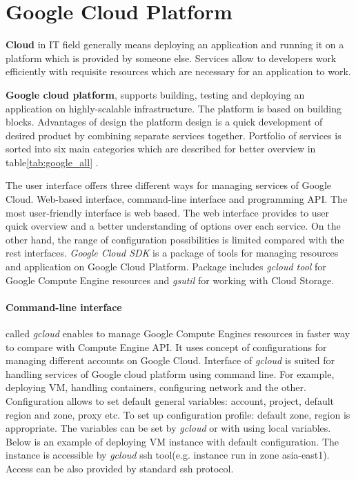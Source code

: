 \documentclass[a4paper,12pt,oneside]{report}
\begin{document}
		
	\section{Google Cloud Platform}
\textbf{Cloud} in IT field generally means deploying an application and running it on a platform which is 
provided by someone else. Services allow to developers  work efficiently  with 
requisite resources which are necessary for an application to work.

\textbf{Google cloud platform}, supports building, testing and deploying an application on highly-scalable 
infrastructure.
The platform is based on building blocks. Advantages of design the platform design is a quick development of 
desired product by combining separate services together. Portfolio of services is sorted into six main categories 
which are described for better overview in 
table\ref{tab:google_all} \cite{gc_product_services}.

The user interface offers three different ways for managing services of Google Cloud. Web-based interface, command-line 
interface and programming API. The most user-friendly interface is web based. The web interface provides to 
user quick overview and a better understanding of 
options over each service. On the other hand, the range of configuration possibilities is limited compared with the rest 
interfaces. \textit{Google Cloud SDK} is a 
package of tools for managing resources and application on Google Cloud Platform. 
Package includes \textit{gcloud tool} for Google Compute Engine resources and \textit{gsutil} for working with Cloud Storage.



\paragraph{Command-line interface} called \textit{gcloud} enables to manage Google Compute Engines resources in faster way 
to compare with Compute Engine API. It uses concept of configurations for managing different accounts on Google Cloud. 
Interface of \textit{gcloud} is suited for handling services of Google cloud platform using command line. For example, 
deploying VM, handling containers, configuring network and the other.
Configuration allows to set default general variables: account, project, default region 
and zone, proxy etc. To set up configuration profile: default zone, region is appropriate. 
The variables can be set by \textit{gcloud} or with using 
local variables.
Below is an example of deploying VM instance with default configuration. The instance 
is accessible by \textit{gcloud} ssh tool(e.g. instance run in zone asia-east1). Access can be also provided 
by standard ssh protocol.
\end{document}
